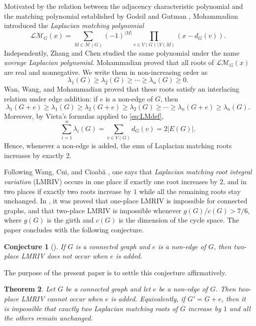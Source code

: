 \documentclass[11pt]{amsart}
\numberwithin{equation}{section}
\newtheorem{theorem}{Theorem}[section]
\newtheorem{conjecture}[theorem]{Conjecture}
\newcommand{\LM}{\mathscr{LM}}
\newcommand{\calM}{\mathcal{M}}
\begin{document}
Motivated by the relation between the adjacency characteristic polynomial and the 
matching polynomial established by Godsil and Gutman \cite{GodsilGutman}, 
Mohammadian \cite{Moham} introduced the \emph{Laplacian matching polynomial}
\begin{equation}\label{eq:LMdef}
\LM_G(x)=\sum_{M\in \calM(G)}(-1)^{|M|}\prod_{v\in V(G)\setminus V(M)}(x-d_G(v)).
\end{equation}
Independently, Zhang and Chen \cite{ZhangChen} studied the same polynomial under the 
name \emph{average Laplacian polynomial}. Mohammadian \cite{Moham} proved 
that all roots of $\LM_G(x)$ are real and nonnegative. We write them in non-increasing 
order as
\[
\lambda_1(G)\ge \lambda_2(G)\ge \cdots \ge \lambda_n(G)\ge 0.
\]
Wan, Wang, and Mohammadian \cite{WWM} proved that these roots satisfy an interlacing 
relation under edge addition: if $e$ is a non-edge of $G$, then
\begin{equation}\label{eq:interlacing}
\lambda_1(G+e)\ge \lambda_1(G)\ge \lambda_2(G+e)\ge \lambda_2(G)\ge \cdots \ge \lambda_n(G+e)\ge \lambda_n(G).
\end{equation}
Moreover, by Vieta's formulas applied to \eqref{eq:LMdef},
\begin{equation}\label{eq:sumroots}
\sum_{i=1}^n \lambda_i(G)=\sum_{v\in V(G)} d_G(v)=2|E(G)|.
\end{equation}
Hence, whenever a non-edge is added, the sum of Laplacian matching roots increases by exactly $2$.

Following Wang, Cui, and Cioab\u{a} \cite{WCC}, one says that \emph{Laplacian matching root 
integral variation} (LMRIV) occurs in one place if exactly one root increases by $2$, and in 
two places if exactly two roots increase by $1$ while all the remaining roots stay unchanged. 
In \cite{WCC}, it was proved that one-place LMRIV is impossible for connected graphs, 
and that two-place LMRIV is impossible whenever $g(G)/c(G)>7/6$, where $g(G)$ is the girth 
and $c(G)$ is the dimension of the cycle space. The paper concludes with the following conjecture.

\begin{conjecture}[{\cite[Conjecture~3.11]{WCC}}]\label{conj:WCC}
If $G$ is a connected graph and $e$ is a non-edge of $G$, then two-place LMRIV does not occur when $e$ is added.
\end{conjecture}

The purpose of the present paper is to settle this conjecture affirmatively.

\begin{theorem}\label{thm:main}
Let $G$ be a connected graph and let $e$ be a non-edge of $G$. Then two-place LMRIV cannot 
occur when $e$ is added. Equivalently, if $G'=G+e$, then it is impossible that exactly two 
Laplacian matching roots of $G$ increase by $1$ and all the others remain unchanged.
\end{theorem}
\end{document}
